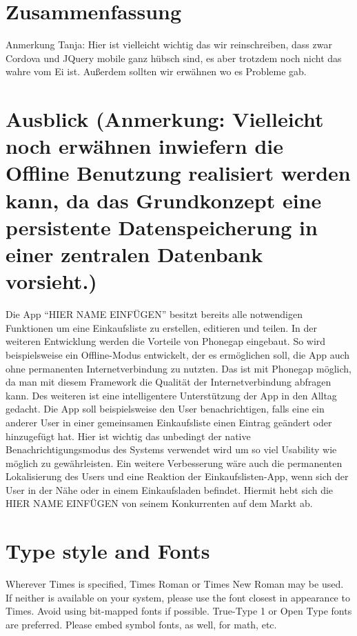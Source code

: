 \documentclass[10pt, conference, compsocconf]{IEEEtran}
\begin{document}
\section{Zusammenfassung}
Anmerkung Tanja: Hier ist vielleicht wichtig das wir reinschreiben, dass zwar Cordova und JQuery mobile ganz h\"ubsch sind, es aber trotzdem noch nicht das wahre vom Ei ist. Au{\ss}erdem sollten wir erw\"ahnen wo es Probleme gab.

\section {Ausblick (Anmerkung: Vielleicht noch erw\"ahnen inwiefern die Offline Benutzung realisiert werden kann, da das Grundkonzept eine persistente Datenspeicherung in einer zentralen Datenbank vorsieht.)}
Die App “HIER NAME EINFÜGEN” besitzt bereits alle notwendigen Funktionen um eine Einkaufsliste zu erstellen, editieren und teilen. In der weiteren Entwicklung werden die Vorteile von Phonegap eingebaut. So wird beispielsweise ein Offline-Modus entwickelt, der es erm\"oglichen soll, die App auch ohne permanenten Internetverbindung zu nutzten. Das ist mit Phonegap m\"oglich, da man mit diesem Framework die Qualit\"at der Internetverbindung abfragen kann. Des weiteren ist eine intelligentere Unterst\"utzung der App in den Alltag gedacht. Die App soll beispielsweise den User benachrichtigen, falls eine ein anderer User in einer gemeinsamen Einkaufsliste einen Eintrag ge\"andert oder hinzugef\"ugt hat. Hier ist wichtig das unbedingt der native Benachrichtigungsmodus des Systems verwendet wird um so viel Usability wie m\"oglich zu gew\"ahrleisten. Ein weitere Verbesserung w\"are auch die permanenten Lokalisierung des Users und eine Reaktion der Einkaufslisten-App, wenn sich der User in der N\"ahe oder in einem Einkaufsladen befindet. Hiermit hebt sich die HIER NAME EINFÜGEN von seinem Konkurrenten auf dem Markt ab.

\section{Type style and Fonts}
Wherever Times is specified, Times Roman or Times New Roman may be used. If neither is available on your system, please use the font closest in appearance to Times. Avoid using bit-mapped fonts if possible. True-Type 1 or Open Type fonts are preferred. Please embed symbol fonts, as well, for math, etc.
\end{document}
